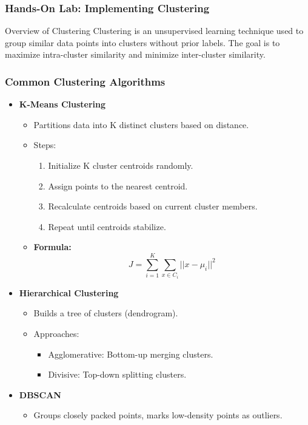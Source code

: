 \documentclass[aspectratio=169]{beamer}
\begin{document}
\begin{frame}
    \frametitle{Hands-On Lab: Implementing Clustering}
    \begin{block}{Overview of Clustering}
        Clustering is an unsupervised learning technique used to group similar data points into clusters without prior labels. The goal is to maximize intra-cluster similarity and minimize inter-cluster similarity.
    \end{block}
\end{frame}

\begin{frame}
    \frametitle{Common Clustering Algorithms}
    \begin{itemize}
        \item \textbf{K-Means Clustering}
            \begin{itemize}
                \item Partitions data into K distinct clusters based on distance.
                \item Steps:
                    \begin{enumerate}
                        \item Initialize K cluster centroids randomly.
                        \item Assign points to the nearest centroid.
                        \item Recalculate centroids based on current cluster members.
                        \item Repeat until centroids stabilize.
                    \end{enumerate}
                \item \textbf{Formula:} 
                \begin{equation}
                    J = \sum_{i=1}^K \sum_{x \in C_i} || x - \mu_i ||^2 
                \end{equation}
            \end{itemize}

        \item \textbf{Hierarchical Clustering}
            \begin{itemize}
                \item Builds a tree of clusters (dendrogram).
                \item Approaches:
                    \begin{itemize}
                        \item Agglomerative: Bottom-up merging clusters.
                        \item Divisive: Top-down splitting clusters.
                    \end{itemize}
            \end{itemize}

        \item \textbf{DBSCAN}
            \begin{itemize}
                \item Groups closely packed points, marks low-density points as outliers.
            \end{itemize}
    \end{itemize}
\end{frame}
\end{document}
